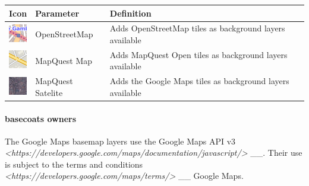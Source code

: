 \documentclass[letterpaper,10pt,english]{sphinxmanual}
\begin{document}
\begin{tabulary}{\linewidth}{|L|L|L|}
\hline

\textbf{Icon}
 & 
\textbf{Parameter}
 & 
\textbf{Definition}
\\
\hline
\includegraphics{osm-layer-icon.png}
 & 
OpenStreetMap
 & 
Adds OpenStreetMap tiles as background layers available
\\
\hline
\includegraphics{mqstr-layer-icon.png}
 & 
MapQuest Map
 & 
Adds MapQuest Open tiles as background layers available
\\
\hline
\includegraphics{mqsat-layer-icon.png}
 & 
MapQuest Satelite
 & 
Adds the Google Maps tiles as background layers available
\\
\hline\end{tabulary}

\paragraph{basecoats owners}

The Google Maps basemap layers use the Google Maps API v3 \emph{\textless{}https://developers.google.com/maps/documentation/javascript/\textgreater{}} \_\_. Their use is subject to the terms and conditions \emph{\textless{}https://developers.google.com/maps/terms/\textgreater{}} \_\_ Google Maps.
\end{document}
